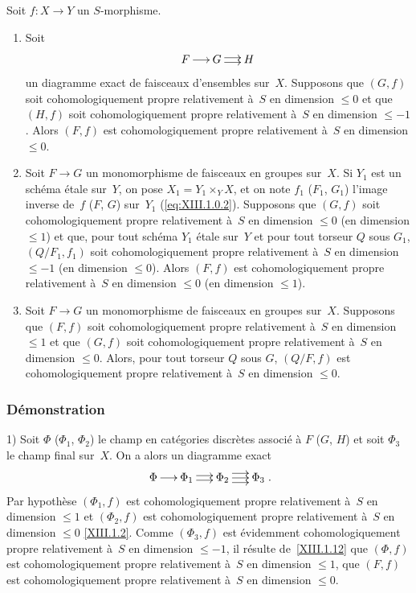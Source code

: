 \begin{proposition}
\label{XIII.1.13}
Soit $f \colon X \to Y$ un $S$-morphisme.
\begin{enumerate}
\item[1)] Soit
$$
\xymatrix@C=.5cm{{F}\ar[r]&{G}\ar@<2pt>[r]\ar@<-2pt>[r]&{H}}
$$
un diagramme exact de faisceaux d'ensembles sur~$X$. Supposons que
$(G,f)$ soit cohomologiquement propre relativement \`a~$S$ en
dimension $\leqslant 0$ et que $(H,f)$ soit cohomologiquement propre
relativement \`a~$S$ en dimension $\leqslant -1$. Alors $(F,f)$ est
cohomologiquement propre relativement \`a~$S$ en dimension
$\leqslant 0$.
\item[2)]
Soit
$F \to G$ un monomorphisme de faisceaux en groupes sur~$X$. Si
$Y_1$ est un sch\'ema \'etale sur~$Y$, on pose $X_1 = Y_1 \times_Y
X$, et on note $f_1$ (\resp $F_1$, \resp $G_1$) l'image inverse de~$f$
(\resp $F$, \resp $G$) sur~$Y_1$ (\cf \ref{eq:XIII.1.0.2}). Supposons
que $(G,f)$ soit cohomologiquement propre relativement \`a~$S$ en
dimension $\leqslant 0$ (\resp en dimension $\leqslant 1$) et que,
pour tout sch\'ema $Y_1$ \'etale sur~$Y$ et pour tout torseur $Q$
sous $G_1$, $(Q/F_1, f_1)$ soit cohomologiquement propre relativement
\`a~$S$ en dimension $\leqslant -1$ (\resp en dimension $\leqslant
0$). Alors $(F,f)$ est cohomologiquement propre relativement \`a~$S$
en dimension $\leqslant 0$ (\resp en dimension $\leqslant 1$).
\item[3)] Soit $F \to G$ un monomorphisme de faisceaux en groupes sur~$X$. Supposons que $(F,f)$ soit cohomologiquement propre relativement
\`a~$S$ en dimension $\leqslant 1$ et que $(G,f)$ soit
cohomologiquement propre relativement \`a~$S$ en dimension
$\leqslant 0$. Alors, pour tout torseur $Q$ sous $G$, $(Q/F, f)$ est
cohomologiquement propre relativement \`a~$S$ en dimension
$\leqslant 0$.
\end{enumerate}
\end{proposition}

\subsubsection*{D\'emonstration}
1) Soit $\Phi$ (\resp $\Phi_1$, \resp $\Phi_2$) le champ en
cat\'egories discr\`etes associ\'e \`a $F$ (\resp $G$,
\resp $H$) et soit $\Phi_3$ le champ final sur~$X$. On a alors un
diagramme exact
$$
\xymatrix@C=.5cm{{\Phi}\ar[r]&{\Phi_1}\ar@<2pt>[r]\ar@<-2pt>[r]&{\Phi_2}\ar@<4pt>[r]\ar[r]\ar@<-4pt>[r]&{\Phi_3}}
\text{.}
$$
Par hypoth\`ese $(\Phi_1, f)$ est cohomologiquement propre
relativement \`a~$S$ en dimension $\leqslant 1$ et $(\Phi_2, f)$ est
cohomologiquement propre relativement \`a~$S$ en dimension
$\leqslant 0$ \eqref{XIII.1.2}. Comme $(\Phi_3, f)$ est \'evidemment
cohomologiquement propre relativement \`a~$S$ en dimension
$\leqslant -1$, il r\'esulte de~\ref{XIII.1.12} que $(\Phi, f)$ est
cohomologiquement propre relativement \`a~$S$ en dimension
$\leqslant 1$, \ie que $(F,f)$ est cohomologiquement propre
relativement \`a~$S$ en dimension $\leqslant 0$.

